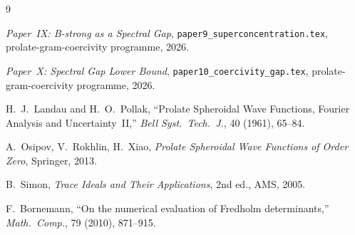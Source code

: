 \documentclass[12pt,a4paper]{article}
\begin{document}
\begin{thebibliography}{9}

  \textit{Paper~IX: B-strong as a Spectral Gap},
  \texttt{paper9\_superconcentration.tex},
  prolate-gram-coercivity programme, 2026.

  \textit{Paper~X: Spectral Gap Lower Bound},
  \texttt{paper10\_coercivity\_gap.tex},
  prolate-gram-coercivity programme, 2026.

  H.~J.~Landau and H.~O.~Pollak,
  ``Prolate Spheroidal Wave Functions,
  Fourier Analysis and Uncertainty~II,''
  \textit{Bell Syst.\ Tech.\ J.}, 40 (1961), 65--84.

  A.~Osipov, V.~Rokhlin, H.~Xiao,
  \textit{Prolate Spheroidal Wave Functions of Order Zero},
  Springer, 2013.

  B.~Simon,
  \textit{Trace Ideals and Their Applications},
  2nd ed., AMS, 2005.

  F.~Bornemann,
  ``On the numerical evaluation of Fredholm determinants,''
  \textit{Math.\ Comp.}, 79 (2010), 871--915.

\end{thebibliography}
\end{document}
